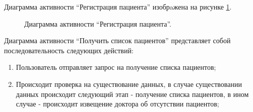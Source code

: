         Диаграмма активности “Регистрация пациента” изобрaжена на рисунке \ref{diagram-registration}.
        \begin{figure}[H]%
            \centering
            \caption{Диаграмма активности “Регистрация пациента”.} \label{diagram-registration}
        \end{figure} 

        Диаграмма активности  “Получить список пациентов” представляет собой %
        последовательность следующих действий:

        \begin{enumerate}
            \item Пользователь отправляет запрос на получение списка пациентов;
            \item Происходит проверка на существование данных, в случае %
            существовании данных происходит следующий этап - получение списка %
            пациентов, в ином случае - происходит извещение доктора об отсутствии пациентов;
        \end{enumerate}
        
